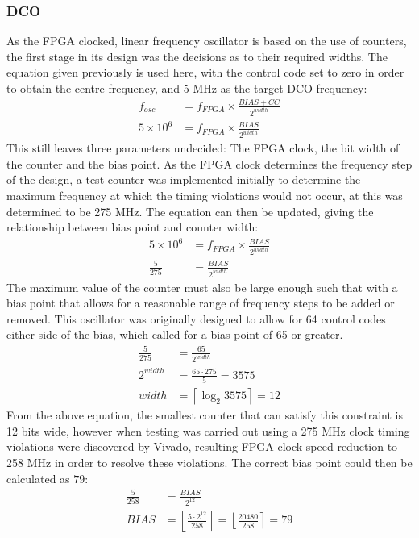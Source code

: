 \subsubsection{\acl{DCO}}
As the \ac{FPGA} clocked, linear frequency oscillator is based on the use of counters, the first stage in its design was the decisions as to their required widths. The equation given previously is used here, with the control code set to zero in order to obtain the centre frequency, and 5 MHz as the target \ac{DCO} frequency:
\begin{align}
f_{osc} &= f_{FPGA}\times\frac{BIAS+CC}{2^{width}}\\
5\times 10^6 &= f_{FPGA}\times\frac{BIAS}{2^{width}}
\end{align}
This still leaves three parameters undecided: The \ac{FPGA} clock, the bit width of the counter and the bias point. As the \ac{FPGA} clock determines the frequency step of the design, a test counter was implemented initially to determine the maximum frequency at which the timing violations would not occur, at this was determined to be 275 MHz. The equation can then be updated, giving the relationship between bias point and counter width:
\begin{align}
5\times 10^6 &= f_{FPGA}\times\frac{BIAS}{2^{width}}\\
\frac{5}{275} &= \frac{BIAS}{2^{width}}
\end{align}
The maximum value of the counter must also be large enough such that with a bias point that allows for a reasonable range of frequency steps to be added or removed. 
This oscillator was originally designed to allow for 64 control codes either side of the bias, which called for a bias point of 65 or greater.
\begin{align}
\frac{5}{275} &= \frac{65}{2^{width}}\\
2^{width} &= \frac{65\cdot275}{5} = 3575 \\
width &= \left \lceil{\log_2 3575}\right \rceil = 12
\end{align}
From the above equation, the smallest counter that can satisfy this constraint is 12 bits wide, however when testing was carried out using a 275 MHz clock timing violations were discovered by Vivado, resulting \ac{FPGA} clock speed reduction to 258 MHz in order to resolve these violations. The correct bias point could then be calculated as $79$:
\begin{align}
\frac{5}{258} &= \frac{BIAS}{2^{12}}\\
 BIAS &= \left \lfloor{\frac{5\cdot 2^{12}}{258}}\right \rceil = \left \lfloor{\frac{20480}{258}}\right \rceil = 79
\end{align}
